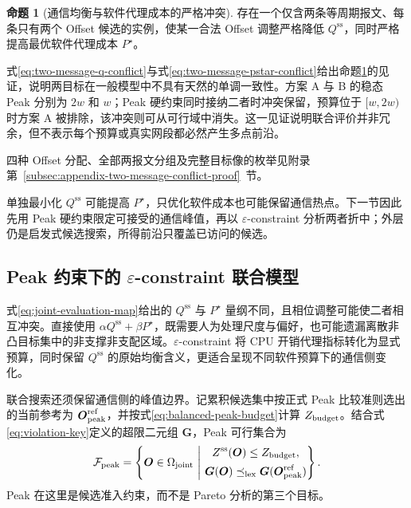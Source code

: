 \documentclass[UTF8,a4paper,twoside,zihao=-4]{ctexart}
\numberwithin{equation}{section}
\numberwithin{figure}{section}
\numberwithin{table}{section}
\theoremstyle{definition}
\newtheorem{proposition}{命题}
\newcommand{\Fset}{\mathcal{F}}
\numberwithin{algocf}{section}
\begin{document}
\begin{proposition}[通信均衡与软件代理成本的严格冲突]
\label{prop:two-message-strict-conflict}
存在一个仅含两条等周期报文、每条只有两个 Offset 候选的实例，使某一合法 Offset 调整严格降低 $Q^{\mathrm{ss}}$，同时严格提高最优软件代理成本 $P^\star$。
\end{proposition}

式\eqref{eq:two-message-q-conflict}与式\eqref{eq:two-message-pstar-conflict}给出命题\ref{prop:two-message-strict-conflict}的见证，说明两目标在一般模型中不具有天然的单调一致性。方案 A 与 B 的稳态 Peak 分别为 $2w$ 和 $w$；Peak 硬约束同时接纳二者时冲突保留，预算位于 $[w,2w)$ 时方案 A 被排除，该冲突则可从可行域中消失。这一见证说明联合评价并非冗余，但不表示每个预算或真实网段都必然产生多点前沿。

四种 Offset 分配、全部两报文分组及完整目标像的枚举见附录第~\ref{subsec:appendix-two-message-conflict-proof}~节。

单独最小化 $Q^{\mathrm{ss}}$ 可能提高 $P^\star$，只优化软件成本也可能保留通信热点。下一节因此先用 Peak 硬约束限定可接受的通信峰值，再以 $\varepsilon$-constraint 分析两者折中；外层仍是启发式候选搜索，所得前沿只覆盖已访问的候选。

\subsection{Peak 约束下的 \texorpdfstring{$\varepsilon$-constraint}{Epsilon-constraint} 联合模型}
\label{subsec:joint-epsilon-model}

式\eqref{eq:joint-evaluation-map}给出的 $Q^{\mathrm{ss}}$ 与 $P^\star$ 量纲不同，且相位调整可能使二者相互冲突。直接使用 $\alpha Q^{\mathrm{ss}}+\beta P^\star$，既需要人为处理尺度与偏好，也可能遗漏离散非凸目标集中的非支撑非支配区域。$\varepsilon$-constraint 将 CPU 开销代理指标转化为显式预算，同时保留 $Q^{\mathrm{ss}}$ 的原始均衡含义，更适合呈现不同软件预算下的通信侧变化\cite{mavrotas2009}。

联合搜索还须保留通信侧的峰值边界。记累积候选集中按正式 Peak 比较准则选出的当前参考为 $\boldsymbol O_{\rm peak}^{\rm ref}$，并按式\eqref{eq:balanced-peak-budget}计算 $Z_{\rm budget}$。结合式\eqref{eq:violation-key}定义的超限二元组 $\boldsymbol G$，Peak 可行集合为
\begin{equation}
 \Fset_{\rm peak}
 =
 \left\{
  \boldsymbol O\in\Omega_{\rm joint}
  \ \middle|\
  \begin{gathered}
   Z^{\mathrm{ss}}(\boldsymbol O)\le Z_{\rm budget},\\
   \boldsymbol G(\boldsymbol O)
   \preceq_{\rm lex}
   \boldsymbol G(\boldsymbol O_{\rm peak}^{\rm ref})
  \end{gathered}
 \right\}.
\label{eq:joint-peak-feasible-set}
\end{equation}
Peak 在这里是候选准入约束，而不是 Pareto 分析的第三个目标。
\end{document}
